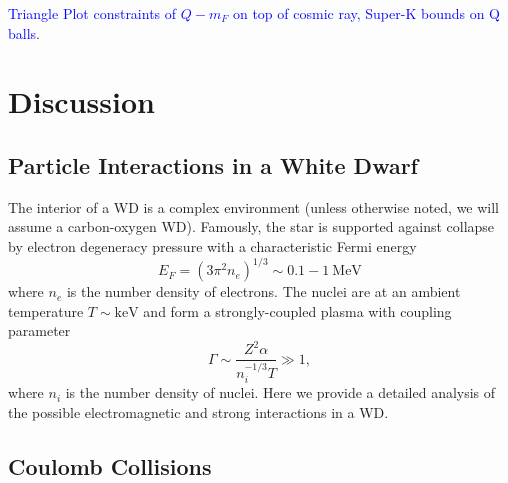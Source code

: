 \documentclass[twocolumn,showpacs,preprintnumbers,amsmath,amssymb,prd]{revtex4}
\begin{document}
\textcolor{blue}{Triangle Plot constraints of $Q - m_F$ on top of cosmic ray, Super-K bounds on Q balls}.

\section{Discussion}
\label{sec:discussion}

\begin{appendices}

\section{Particle Interactions in a White Dwarf}
\label{sec:appendix}

The interior of a WD is a complex environment (unless otherwise noted, we will assume a carbon-oxygen WD). Famously, the star is supported against collapse by electron degeneracy pressure with a characteristic Fermi energy
\begin{equation}
E_F = (3 \pi^2 n_e)^{1/3} \sim 0.1 - 1 ~\text{MeV}
\end{equation}
where $n_e$ is the number density of electrons. The nuclei are at an ambient temperature $T \sim \text{keV}$ and form a strongly-coupled plasma with coupling parameter
\begin{equation}
\Gamma \sim \frac{Z^2 \alpha}{n_i^{-1/3} T} \gg 1,
\end{equation}
where $n_i$ is the number density of nuclei. Here we provide a detailed analysis of the possible electromagnetic and strong interactions in a WD.

\subsection*{Coulomb Collisions}


\end{appendices}
\end{document}
